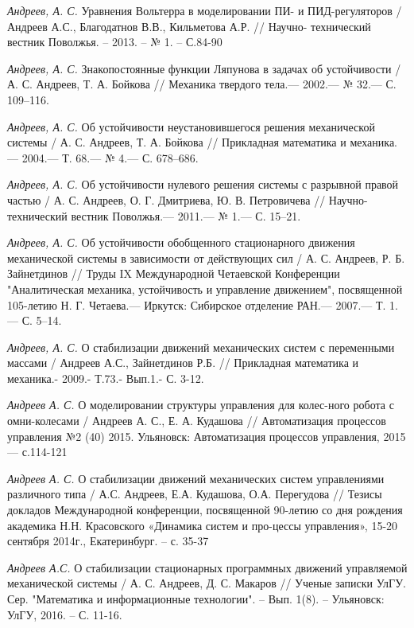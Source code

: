 \begin{thebibliography}{10}
	{\it Андреев, А. С.} Уравнения Вольтерра в моделировании ПИ- и ПИД-регуляторов / Андреев А.С., Благодатнов В.В., Кильметова А.Р. // Научно-		технический вестник Поволжья. – 2013. – № 1. – С.84-90
	
	{\it Андреев, А. С.} Знакопостоянные функции Ляпунова в задачах об устойчивости /
	А. С. Андреев, Т. А. Бойкова // Механика твердого тела.— 2002.— № 32.— С. 109–116.

	{\it Андреев, А. С.} Об устойчивости неустановившегося решения механической системы /
	А. С. Андреев, Т. А. Бойкова // Прикладная математика и механика.— 2004.— Т. 68.— № 4.— С. 678–686.

	{\it Андреев, А. С.} Об устойчивости нулевого решения системы с разрывной правой частью /
	А. С. Андреев, О. Г. Дмитриева, Ю. В. Петровичева // Научно-технический вестник Поволжья.— 2011.— № 1.—
	С. 15–21.

	{\it Андреев, А. С.} Об устойчивости обобщенного стационарного движения механической системы в зависимости от действующих сил /
	А. С. Андреев, Р. Б. Зайнетдинов // Труды IX Международной Четаевской Конференции "Аналитическая механика, устойчивость и управление движением", 	посвященной 105-летию Н. Г. Четаева.— Иркутск: Сибирское отделение РАН.— 2007.— Т. 1.— С. 5–14.

	{\it Андреев, А. С.}  О стабилизации движений механических систем с
	переменными массами / Андреев А.С., Зайнетдинов Р.Б. //  Прикладная математика и механика.- 2009.- Т.73.- Вып.1.- С. 3-12.

	{\it Андреев А. С.} О моделировании структуры управления для колес-ного робота с омни-колесами / Андреев А. С., Е. А. Кудашова // Автоматизация 	процессов управления №2 (40) 2015. Ульяновск: Автоматизация процессов управления, 2015 — с.114-121

	{\it Андреев А. С.} О стабилизации движений механических систем управлениями различного типа / А.С. Андреев, Е.А. Кудашова, О.А. Перегудова // 		Тезисы докладов Международной конференции, посвященной 90-летию со дня рождения академика Н.Н. Красовского «Динамика систем и про-цессы 			управления», 15-20 сентября 2014г., Екатеринбург. – с. 35-37

	{\it Андреев А.С.} О стабилизации стационарных программных движений управляемой механической системы / А. С. Андреев, Д. С.  Макаров // Ученые записки УлГУ. Сер. "Математика и информационные технологии". -- Вып. 1(8). -- Ульяновск: УлГУ, 2016. -- С. 11-16.


\end{thebibliography}
